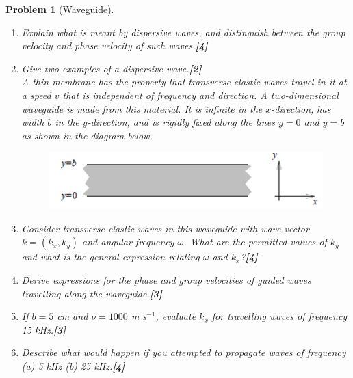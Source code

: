 \documentclass[a4paper]{article}
\theoremstyle{new}
\newtheorem{qns}{Problem}[subsection]
\begin{document}
\newpage
\begin{qns}[Waveguide]\leavevmode
\begin{enumerate}[label=(\roman*)]
\item Explain what is meant by dispersive waves, and distinguish between the group velocity and phase velocity of such waves.\hfill\textbf{[4]}
\item Give two examples of a dispersive wave.\hfill\textbf{[2]}\\[5pt]
A thin membrane has the property that transverse elastic waves travel in it at a speed $v$ that is independent of frequency and direction. A two-dimensional waveguide is made from this material. It is infinite in the $x$-direction, has width $b$ in the $y$-direction, and is rigidly fixed along the lines $y = 0$ and $y = b$ as shown in the diagram below.
\begin{figure}[H]
    \centering
    \includegraphics[scale=0.65]{2010P1B7Q.PNG}
\end{figure}
\item  Consider transverse elastic waves in this waveguide with wave vector $k = (k_x, k_y)$ and angular frequency $\omega$. What are the permitted values of $k_y$ and what is the general expression relating $\omega$ and $k_x$?\hfill\textbf{[4]}
\item Derive expressions for the phase and group velocities of guided waves travelling along the waveguide.\hfill\textbf{[3]}
\item If $b = 5$ cm and $\nu = 1000$ m s$^{−1}$, evaluate $k_x$ for travelling waves of frequency 15 kHz.\hfill\textbf{[3]}
\item Describe what would happen if you attempted to propagate waves of frequency (a) 5 kHz (b) 25 kHz.\hfill\textbf{[4]}
\end{enumerate}
\end{qns}
\end{document}
